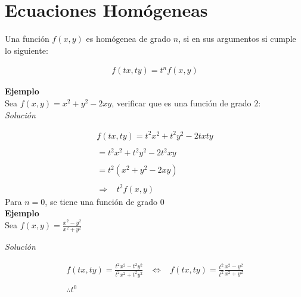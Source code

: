 \chapter{Ecuaciones Homógeneas}
Una función \(\displaystyle f(x,y)\) es homógenea de grado \(\displaystyle n\), si en sus argumentos si cumple lo siguiente:

\begin{equation*}
    \begin{gathered}
        f(tx,ty)=t^{n}f(x,y)
    \end{gathered}
\end{equation*}

\textbf{Ejemplo}\\

Sea \(\displaystyle f(x,y)=x^{2}+y^{2}-2xy\), verificar que es una función de grado \(\displaystyle 2\):\\

\textit{Solución}

\begin{equation*}
    \begin{gathered}
        f(tx,ty)=t^{2}x^{2}+t^{2}y^{2}-2txty\\\\
        =t^{2}x^{2}+t^{2}y^{2}-2t^{2}xy\\\\
        =t^{2}(x^{2}+y^{2}-2xy)\\\\
        \Rightarrow\;\;\;t^{2}f(x,y)
    \end{gathered}
\end{equation*}
Para \(\displaystyle n=0\), se tiene una función de grado \(\displaystyle 0\)\\

\textbf{Ejemplo}\\

Sea \(\displaystyle f(x,y)=\frac{x^{2}-y^{2}}{x^{2}+y^{2}}\)

\textit{Solución}

\begin{equation*}
    \begin{gathered}
        f(tx,ty)=\frac{t^{2}x^{2}-t^{2}y^{2}}{t^{2}x^{2}+t^{2}y^{2}}\;\;\;\Leftrightarrow\;\;\;f(tx,ty)=\frac{t^{2}}{t^{2}}\frac{x^{2}-y^{2}}{x^{2}+y^{2}}\\\\
        \therefore t^{0}
    \end{gathered}
\end{equation*}

